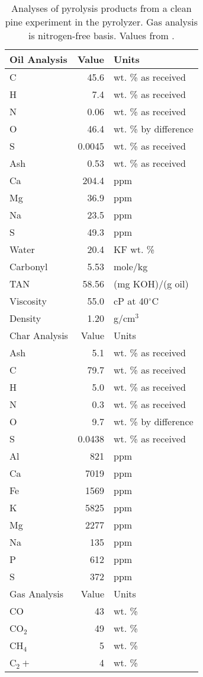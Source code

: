 \begin{table}[H]
    \centering
    \caption{Analyses of pyrolysis products from a clean pine experiment in the pyrolyzer. Gas analysis is nitrogen-free basis. Values from \cite{French-2019}.}
    \label{tab:analyses}
    \begin{tabular}{lrl}
        \toprule
        Oil Analysis & Value & Units \\
        \midrule
        C & 45.6 & wt. \% as received \\
        H & 7.4 & wt. \% as received \\
        N & 0.06 & wt. \% as received \\
        O & 46.4 & wt. \% by difference \\
        S & 0.0045 & wt. \% as received \\
        Ash & 0.53 & wt. \% as received \\
        Ca & 204.4 & ppm \\
        Mg & 36.9 & ppm \\
        Na & 23.5 & ppm \\
        S & 49.3 & ppm \\
        Water & 20.4 & KF wt. \% \\
        Carbonyl & 5.53 & mole/kg \\
        TAN & 58.56 & (mg KOH)/(g oil) \\
        Viscosity & 55.0 & cP at 40$^\circ$C \\
        Density & 1.20 & g/cm$^3$ \\
        \midrule
        Char Analysis & Value & Units \\
        \midrule
        Ash & 5.1 & wt. \% as received \\
        C & 79.7 & wt. \% as received \\
        H & 5.0 & wt. \% as received \\
        N & 0.3 & wt. \% as received \\
        O & 9.7 & wt. \% by difference \\
        S & 0.0438 & wt. \% as received \\
        Al & 821 & ppm \\
        Ca & 7019 & ppm \\
        Fe & 1569 & ppm \\
        K & 5825 & ppm \\
        Mg & 2277 & ppm \\
        Na & 135 & ppm \\
        P & 612 & ppm \\
        S & 372 & ppm \\
        \midrule
        Gas Analysis & Value & Units \\
        \midrule
        CO & 43 & wt. \% \\
        CO$_2$ & 49 & wt. \% \\
        CH$_4$ & 5 & wt. \% \\
        C$_2+$ & 4 & wt. \% \\
        \bottomrule
    \end{tabular}
\end{table}
